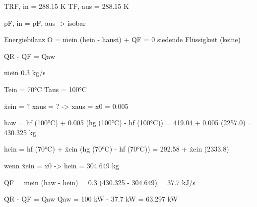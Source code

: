 TRF, in = 288.15 K  
TF, aus = 288.15 K  

pF, in = pF, aus -> isobar  

Energiebilanz  
O = ṁein (hein - haust) + Q̇F = 0  
siedende Flüssigkeit (keine)  

Q̇R - Q̇F = Q̇aw  

ṁein 0.3 kg/s  

Tein = 70°C  
Taus = 100°C  

ẋein = ?  
xaus = ? -> xaus = x0 = 0.005  

haw = hf (100°C) + 0.005 (hg (100°C) - hf (100°C))  
= 419.04 + 0.005 (2257.0)  
= 430.325 kg  

hein = hf (70°C) + ẋein (hg (70°C) - hf (70°C))  
= 292.58 + ẋein (2333.8)  

wenn ẋein = x0 -> hein = 304.649 kg  

Q̇F = ṁein (haw - hein)  
= 0.3 (430.325 - 304.649)  
= 37.7 kJ/s  

Q̇R - Q̇F = Q̇aw  
Q̇aw = 100 kW - 37.7 kW = 63.297 kW